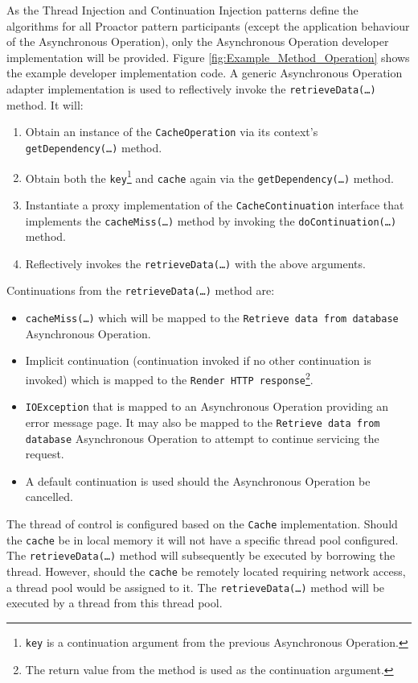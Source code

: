 \documentclass[prodmode]{style/acmlarge}
\begin{document}
As the Thread Injection and Continuation Injection patterns define the
algorithms for all Proactor pattern participants (except the application
behaviour of the Asynchronous Operation), only the Asynchronous Operation
developer implementation will be provided.  Figure
\ref{fig:Example_Method_Operation} shows the example developer implementation
code.  A generic Asynchronous Operation adapter implementation is used to
reflectively invoke the \texttt{retrieveData(\ldots)} method. It will:
\begin{enumerate}
  \item Obtain an instance of the \texttt{CacheOperation} via its context's \texttt{getDependency(\ldots)} method.
  \item Obtain both the \texttt{key}\footnote{\texttt{key} is a continuation argument from the previous Asynchronous Operation.} and \texttt{cache} again via the \texttt{getDependency(\ldots)} method.
  \item Instantiate a proxy implementation of the \texttt{CacheContinuation} interface that implements the \texttt{cacheMiss(\ldots)} method by invoking the \texttt{doContinuation(\ldots)} method. 
  \item Reflectively invokes the \texttt{retrieveData(\ldots)} with the above arguments.
\end{enumerate}

Continuations from the \texttt{retrieveData(\ldots)} method are:
\begin{itemize}
  \item \texttt{cacheMiss(\ldots)} which will be mapped to the \texttt{Retrieve data from database} Asynchronous Operation.
  \item Implicit continuation (continuation invoked if no other continuation is invoked) which is mapped to the \texttt{Render HTTP response}\footnote{The return value from the method is used as the continuation argument.}.
  \item \texttt{IOException} that is mapped to an Asynchronous Operation providing an error message page.  It may also be mapped to the \texttt{Retrieve data from database} Asynchronous Operation to attempt to continue servicing the request.
  \item A default continuation is used should the Asynchronous Operation be cancelled.
\end{itemize}

The thread of control is configured based on the \texttt{Cache} implementation.
 Should the \texttt{cache} be in local memory it will not have a specific thread
pool configured.  The \texttt{retrieveData(\ldots)} method will subsequently be
executed by borrowing the thread.  However, should the \texttt{cache} be
remotely located requiring network access, a thread pool would be assigned to
it.  The \texttt{retrieveData(\ldots)} method will be executed by a thread from
this thread pool.
\end{document}
